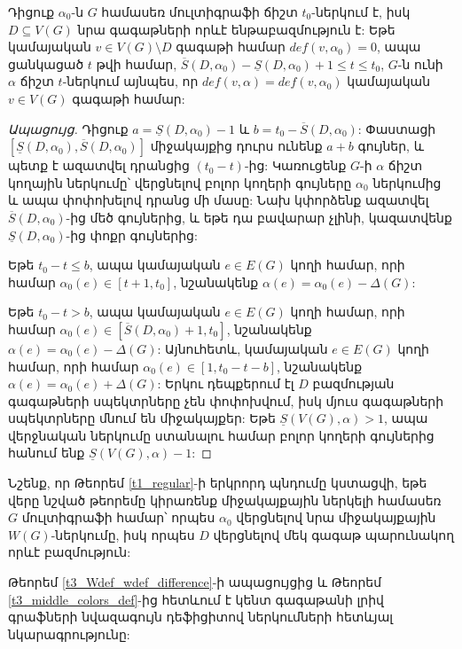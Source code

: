\begin{theorem}
\label{t3_middle_colors_def}
Դիցուք $\alpha_0$-ն $G$ համասեռ մուլտիգրաֆի ճիշտ $t_0$-ներկում է, իսկ $D \subseteq V(G)$ նրա գագաթների որևէ ենթաբազմություն է: Եթե կամայական $v \in V(G) \setminus D$ գագաթի համար $def(v,\alpha_0)=0$, ապա ցանկացած $t$ թվի համար, $\overline{S}(D,\alpha_0) - \underline{S}(D,\alpha_0) + 1 \leq t \leq t_0$, $G$-ն ունի $\alpha$ ճիշտ $t$-ներկում այնպես, որ $def(v,\alpha) = def(v,\alpha_0)$ կամայական $v\in V(G)$ գագաթի համար:
\end{theorem}
\begin{proof}[Ապացույց]
Դիցուք $a = \underline{S}(D,\alpha_0) - 1$ և $b = t_{0} - \overline{S}(D,\alpha_0)$: Փաստացի $[\underline{S}(D,\alpha_0),\overline{S}(D,\alpha_0)]$ միջակայքից դուրս ունենք $a+b$ գույներ, և պետք է ազատվել դրանցից $(t_0 - t)$-ից: Կառուցենք $G$-ի $\alpha$ ճիշտ կողային ներկումը՝ վերցնելով բոլոր կողերի գույները $\alpha_0$ ներկումից և ապա փոփոխելով դրանց մի մասը: Նախ կփորձենք ազատվել $\overline{S}(D,\alpha_0)$-ից մեծ գույներից, և եթե դա բավարար չլինի, կազատվենք $\underline{S}(D,\alpha_0)$-ից փոքր գույներից: 

Եթե $t_0 - t \leq b$, ապա կամայական $e\in E(G)$ կողի համար, որի համար $\alpha_0(e)\in \left[t + 1, t_0\right]$, նշանակենք $\alpha(e) = \alpha_0(e) - \Delta(G)$:

Եթե $t_0 - t > b$, ապա կամայական $e\in E(G)$ կողի համար, որի համար $\alpha_0(e)\in \left[\overline{S}(D, \alpha_0) + 1, t_0\right]$, նշանակենք $\alpha(e) = \alpha_0(e) - \Delta(G)$: Այնուհետև, կամայական $e\in E(G)$ կողի համար, որի համար $\alpha_0(e)\in \left[1, t_0 - t - b \right]$, նշանակենք $\alpha(e) = \alpha_0(e) + \Delta(G)$:
Երկու դեպքերում էլ $D$ բազմության գագաթների սպեկտրները չեն փոփոխվում, իսկ մյուս գագաթների սպեկտրները մնում են միջակայքեր: Եթե $\underline{S}(V(G), \alpha) > 1$, ապա վերջնական ներկումը ստանալու համար բոլոր կողերի գույներից հանում ենք  $\underline{S}(V(G), \alpha) - 1$:
\end{proof}

Նշենք, որ Թեորեմ \ref{t1_regular}-ի երկրորդ պնդումը կստացվի, եթե վերը նշված թեորեմը կիրառենք միջակայքային ներկելի համասեռ $G$ մուլտիգրաֆի համար՝ որպես $\alpha_0$ վերցնելով նրա միջակայքային $W(G)$-ներկումը, իսկ որպես $D$ վերցնելով մեկ գագաթ պարունակող որևէ բազմություն:

Թեորեմ \ref{t3_Wdef_wdef_difference}-ի ապացույցից և Թեորեմ \ref{t3_middle_colors_def}-ից հետևում է կենտ գագաթանի լրիվ գրաֆների նվազագույն դեֆիցիտով ներկումների հետևյալ նկարագրությունը:

